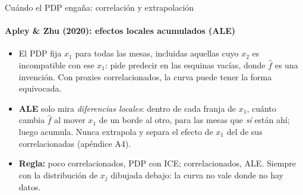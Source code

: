 \documentclass{beamer}
\newcommand{\1}{\mathbb{I}}
\begin{document}
\begin{frame}{Cuándo el PDP engaña: correlación y extrapolación}
\framesubtitle{Apley \& Zhu (2020): efectos locales acumulados (ALE)}
\small
\begin{center}
\end{center}
\pause
\begin{itemize}\itemsep2pt
  \item El PDP fija $x_1$ para todas las mesas, incluidas aquellas cuyo $x_2$ es incompatible con ese $x_1$: pide predecir en las esquinas vacías, donde $\hat{f}$ es una invención. Con proxies correlacionados, la curva puede tener la forma equivocada.
  \item \textbf{ALE} solo mira \emph{diferencias locales}: dentro de cada franja de $x_1$, cuánto cambia $\hat{f}$ al mover $x_1$ de un borde al otro, para las mesas que \emph{sí} están ahí; luego acumula. Nunca extrapola y separa el efecto de $x_1$ del de sus correlacionadas (apéndice A4).
  \item \textbf{Regla:} poco correlacionados, PDP con ICE; correlacionados, ALE. Siempre con la distribución de $x_j$ dibujada debajo: la curva no vale donde no hay datos.
\end{itemize}
\end{frame}
\end{document}

